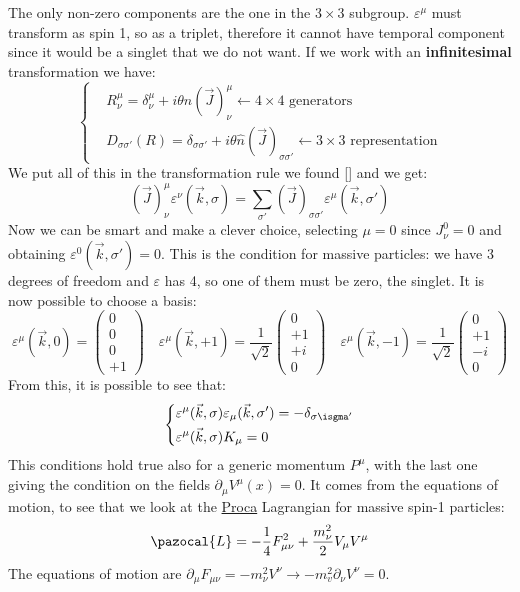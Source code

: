 \documentclass[../main.tex]{subfiles}
\begin{document}
The only non-zero components are the one in the $3\times3$ subgroup. $\varepsilon^\mu$ must transform as spin 1, so as a triplet, therefore it cannot have temporal component since it would be a singlet that we do not want. If we work with an \textbf{infinitesimal} transformation we have:
\[
\left\{
\begin{aligned}
&R^\mu_\nu=\delta^\mu_\nu+i\theta\hat{n}(\vec{J})^\mu_\nu\xleftarrow[]{}\text{$4\times4$ generators}\\
&D_{\sigma\sigma'}(R)=\delta_{\sigma\sigma'}+i\theta\hat{n}(\vec{J})_{\sigma\sigma'}\xleftarrow[]{}\text{$3\times3$ representation}
\end{aligned}
\right.
\]
We put all of this in the transformation rule we found [] and we get:
\[
(\vec{J})^\mu_\nu\varepsilon^\nu(\vec{k},\sigma)=\sum_{\sigma'}(\vec{J})_{\sigma\sigma'}\varepsilon^\mu(\vec{k},\sigma')
\]
Now we can be smart and make a clever choice, selecting $\mu=0$ since $J^0_\nu=0$ and obtaining $\varepsilon^0(\vec{k},\sigma')=0$. This is the condition for massive particles: we have 3 degrees of freedom and $\varepsilon$ has 4, so one of them must be zero, the singlet. It is now possible to choose a basis:
\[
\varepsilon^\mu(\vec{k},0)=\left(\begin{array}{c}
    0 \\
    0 \\
    0 \\
    +1
\end{array}\right)
\quad
\varepsilon^\mu(\vec{k},+1)=\frac{1}{\sqrt{2}}\left(\begin{array}{c}
    0 \\
    +1 \\
    +i \\
    0
\end{array}\right)
\quad
\varepsilon^\mu(\vec{k},-1)=\frac{1}{\sqrt{2}}\left(\begin{array}{c}
    0 \\
    +1 \\
    -i \\
    0
\end{array}\right)
\]
From this, it is possible to see that:
\[
\left\{
\begin{aligned}
&\varepsilon^\mu(\vec{k},\sigma)\varepsilon_\mu(\vec{k},\sigma')=-\delta_{\sigma\isgma'}\\
&\varepsilon^\mu(\vec{k},\sigma)K_\mu=0
\end{aligned}
\right.
\]
This conditions hold true also for a generic momentum $P^\mu$, with the last one giving the condition on the fields $\partial_\mu V^\mu(x)=0$. It comes from the equations of motion, to see that we look at the \href{https://en.wikipedia.org/wiki/Alexandru_Proca}{Proca} Lagrangian for massive spin-1 particles:
\[
\pazocal{L}=-\frac{1}{4}F_{\mu\nu}^2+\frac{m_\nu^2}{2}V_\mu V^\mu
\]
The equations of motion are $\partial_\mu F_{\mu\nu}=-m_\nu^2V^\nu\to-m_v^2\partial_\nu V^\nu=0$.
\end{document}
